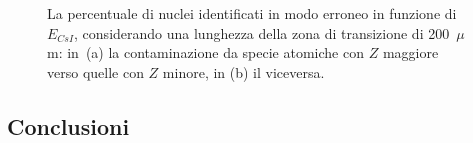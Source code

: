 \begin{figure}[!p] 
	\centering
	\hspace{10mm}
	\caption{La percentuale di nuclei identificati in modo erroneo in funzione di $E_{CsI}$, considerando una lunghezza della zona di transizione di 200~$\mu$m: in~(a) la contaminazione da specie atomiche con $Z$ maggiore verso quelle con $Z$ minore, in (b) il viceversa.} \label{fig:leakage_res_substrate}
\end{figure}



\subsection*{Conclusioni}













